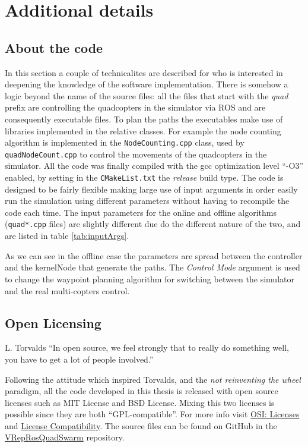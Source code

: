 \chapter{Additional details}


\section{About the code}

In this section a couple of technicalites are described for who is interested in deepening the knowledge of the software implementation. There is somehow a logic beyond the name of the source files: all the files that start with the \emph{quad} prefix are controlling the quadcopters in the simulator via ROS and are consequently executable files. To plan the paths the executables  make use of libraries implemented in the relative classes. For example the node counting algorithm is implemented in the \texttt{NodeCounting.cpp} class, used by  \texttt{quadNodeCount.cpp} to control the movements of the quadcopters in the simulator.
All the code was finally compiled with the gcc optimization level ``-O3'' enabled, by setting in the \texttt{CMakeList.txt} the \emph{release} build type.
The code is designed to be fairly flexible making large use of input arguments in order easily run the simulation using different parameters without having to recompile the code each time. The input parameters for the online and offline algorithms (\texttt{quad*.cpp} files) are slightly different due do the different nature of the two, and are listed in table \ref{tab:inputArgs}.



As we can see in the offline case the parameters are spread between the controller and the kernelNode that generate the paths. The \emph{Control Mode} argument is used to change the waypoint planning algorithm for switching between the simulator and the real multi-copters control.

\section{Open Licensing}

\begin{aquote}{L. Torvalds}
``In open source, we feel strongly that to really do something well, you have to get a lot of people involved.''
\end{aquote}

Following the attitude which inspired Torvalds, and the \emph{not reinventing the wheel} paradigm, all the code developed in this thesis is released with open source licenses such as MIT License and BSD License. Mixing this two licenses is possible since they are both ``GPL-compatible''. For more info visit \href{http://opensource.org/licenses}{OSI: Licenses} and \href{http://en.wikipedia.org/wiki/License_compatibility}{License Compatibility}. The source files can be found on GitHub in the \href{https://github.com/merosss/VRepRosQuadSwarm}{VRepRosQuadSwarm} repository.

